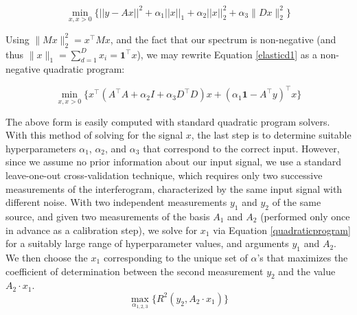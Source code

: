 \documentclass[10pt,a4paper]{article}
\begin{document}
\begin{equation}
\min_{x,x>0} \Big\{ ||y-Ax||^2 + \alpha_1 ||x||_1 + \alpha_2 ||x||_2^2 + \alpha_3 \| D x\|^2_2 \Big\}\label{elasticd1}
\end{equation}

Using $\| Mx\|^2_2 = x^\top M x$, and the fact that our spectrum is non-negative (and thus $\| x \|_1 = \sum^D_{d=1} x_i = \boldsymbol{1}^\top x$), we may rewrite Equation \ref{elasticd1} as a non-negative quadratic program:

\begin{equation}
\min_{x,x>0} \Big\{ x^{\top}\left( A^\top A + \alpha_2 I + \alpha_3 D^\top D \right)x + (\alpha_1 \boldsymbol{1} - A^\top y)^\top x \Big\}\label{quadraticprogram}
\end{equation}

The above form is easily computed with standard quadratic program solvers.
With this method of solving for the signal $x$, the last step is to determine suitable hyperparameters $\alpha_1$, $\alpha_2$, and $\alpha_3$ that correspond to the correct input.  However, since we assume no prior information about our input signal, we use a standard leave-one-out cross-validation technique, which requires only two successive measurements of the interferogram, characterized by the same input signal with different noise.  With two independent measurements $y_1$ and $y_2$ of the same source, and given two measurements of the basis $A_1$ and $A_2$ (performed only once in advance as a calibration step), we solve for $x_1$ via Equation \ref{quadraticprogram} for a suitably large range of hyperparameter values, and arguments $y_1$ and $A_2$.  We then choose the $x_1$ corresponding to the unique set of $\alpha$'s that maximizes the coefficient of determination between the second measurement $y_2$ and the value $A_2 \cdot x_1$.
\begin{equation}
\max_{\alpha_{1,2,3}} \Big\{R^2(y_2, A_2\cdot x_1)\Big\}
\end{equation}
\end{document}
